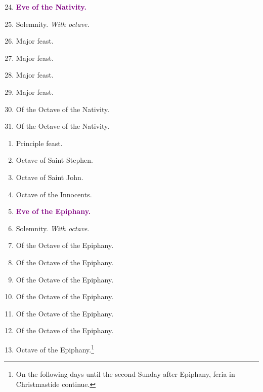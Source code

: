 		\begin{enumerate}
			\setcounter{enumi}{23}
			\item \textcolor{purple}{\textbf{Eve of the Nativity.}}
			\item \textbf{} Solemnity. \textit{With octave.}
			\item {} Major feast.
			\item {} Major feast.
			\item {} Major feast.
			\item {} Major feast.
			\item Of the Octave of the Nativity. %
			\item Of the Octave of the Nativity.
		\end{enumerate}
		\begin{enumerate}
			\item {} Principle feast.
			\item Octave of Saint Stephen.
			\item Octave of Saint John.
			\item Octave of the Innocents.
			\item \textcolor{purple}{\textbf{Eve of the Epiphany.}}
			\item {} Solemnity. \textit{With octave.}
			\item Of the Octave of the Epiphany.
			\item Of the Octave of the Epiphany.
			\item Of the Octave of the Epiphany.
			\item Of the Octave of the Epiphany.
			\item Of the Octave of the Epiphany.
			\item Of the Octave of the Epiphany.
			\item Octave of the Epiphany.\footnote{On the following days until the second Sunday after Epiphany, feria in Christmastide continue.}
		\end{enumerate}